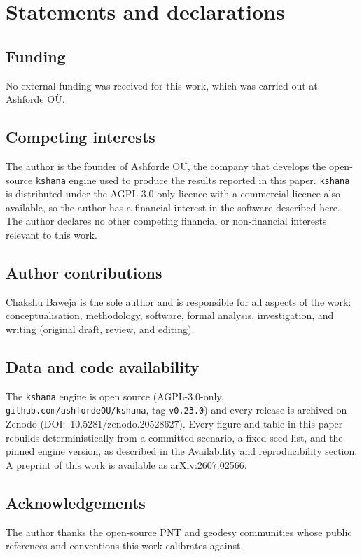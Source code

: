 \documentclass[11pt]{article}
\newcommand{\code}[1]{\texttt{#1}}
\begin{document}
\section*{Statements and declarations}

\subsection*{Funding}
No external funding was received for this work, which was carried out at
Ashforde O\"U.

\subsection*{Competing interests}
The author is the founder of Ashforde O\"U, the company that develops the
open-source \code{kshana} engine used to produce the results reported in this
paper. \code{kshana} is distributed under the AGPL-3.0-only licence with a
commercial licence also available, so the author has a financial interest in the
software described here. The author declares no other competing financial or
non-financial interests relevant to this work.

\subsection*{Author contributions}
Chakshu Baweja is the sole author and is responsible for all aspects of the
work: conceptualisation, methodology, software, formal analysis, investigation,
and writing (original draft, review, and editing).

\subsection*{Data and code availability}
The \code{kshana} engine is open source (AGPL-3.0-only,
\code{github.com/ashfordeOU/kshana}, tag \code{v0.23.0}) and every release is
archived on Zenodo (DOI:~10.5281/zenodo.20528627). Every figure and table in this
paper rebuilds deterministically from a committed scenario, a fixed seed list, and
the pinned engine version, as described in the Availability and reproducibility
section. A preprint of this work is available as arXiv:2607.02566.

\subsection*{Acknowledgements}
The author thanks the open-source PNT and geodesy communities whose public
references and conventions this work calibrates against.



\end{document}
